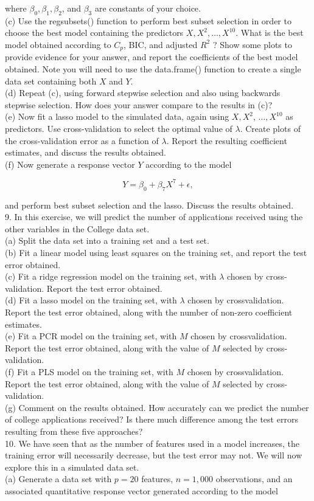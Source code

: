 \documentclass[10pt]{article}
\begin{document}
where $\beta_{0}, \beta_{1}, \beta_{2}$, and $\beta_{3}$ are constants of your choice.\\
(c) Use the regsubsets() function to perform best subset selection in order to choose the best model containing the predictors $X, X^{2}, \ldots, X^{10}$. What is the best model obtained according to $C_{p}$, BIC, and adjusted $R^{2}$ ? Show some plots to provide evidence for your answer, and report the coefficients of the best model obtained. Note you will need to use the data.frame() function to create a single data set containing both $X$ and $Y$.\\
(d) Repeat (c), using forward stepwise selection and also using backwards stepwise selection. How does your answer compare to the results in (c)?\\
(e) Now fit a lasso model to the simulated data, again using $X, X^{2}$, $\ldots, X^{10}$ as predictors. Use cross-validation to select the optimal value of $\lambda$. Create plots of the cross-validation error as a function of $\lambda$. Report the resulting coefficient estimates, and discuss the results obtained.\\
(f) Now generate a response vector $Y$ according to the model

$$
Y=\beta_{0}+\beta_{7} X^{7}+\epsilon,
$$

and perform best subset selection and the lasso. Discuss the results obtained.\\
9. In this exercise, we will predict the number of applications received using the other variables in the College data set.\\
(a) Split the data set into a training set and a test set.\\
(b) Fit a linear model using least squares on the training set, and report the test error obtained.\\
(c) Fit a ridge regression model on the training set, with $\lambda$ chosen by cross-validation. Report the test error obtained.\\
(d) Fit a lasso model on the training set, with $\lambda$ chosen by crossvalidation. Report the test error obtained, along with the number of non-zero coefficient estimates.\\
(e) Fit a PCR model on the training set, with $M$ chosen by crossvalidation. Report the test error obtained, along with the value of $M$ selected by cross-validation.\\
(f) Fit a PLS model on the training set, with $M$ chosen by crossvalidation. Report the test error obtained, along with the value of $M$ selected by cross-validation.\\
(g) Comment on the results obtained. How accurately can we predict the number of college applications received? Is there much difference among the test errors resulting from these five approaches?\\
10. We have seen that as the number of features used in a model increases, the training error will necessarily decrease, but the test error may not. We will now explore this in a simulated data set.\\
(a) Generate a data set with $p=20$ features, $n=1,000$ observations, and an associated quantitative response vector generated according to the model
\end{document}
